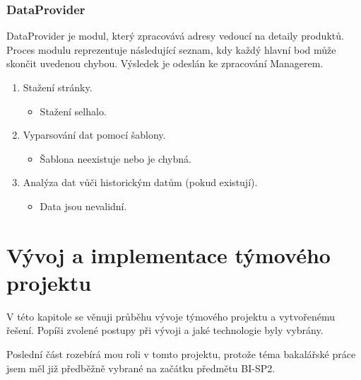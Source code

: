 \documentclass[thesis=B,czech]{FITthesis}[2012/06/26]
\begin{document}
\subsection{DataProvider}
DataProvider je modul, který zpracovává adresy vedoucí na detaily produktů. Proces modulu reprezentuje následující seznam, kdy každý hlavní bod může skončit uvedenou chybou. Výsledek je odeslán ke zpracování Managerem.
\par
\begin{enumerate}
	\item Stažení stránky.
	\begin{itemize}
	\item Stažení selhalo.
	\end{itemize}
	\item Vyparsování dat pomocí šablony.
	\begin{itemize}
	\item Šablona neexistuje nebo je chybná.
	\end{itemize}
	\item Analýza dat vůči historickým datům (pokud existují).
	\begin{itemize}
	\item Data jsou nevalidní.
	\end{itemize}
\end{enumerate}



\chapter{Vývoj a implementace týmového projektu}
V této kapitole se věnuji průběhu vývoje týmového projektu a vytvořenému řešení. Popíši zvolené postupy při vývoji a 
jaké technologie byly vybrány.
\par
Poslední část rozebírá mou roli v tomto
projektu, protože téma bakalářské práce jsem měl již předběžně vybrané na začátku předmětu BI-SP2.
\end{document}
